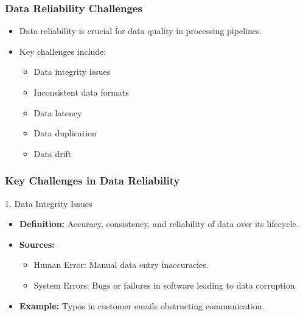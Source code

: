 \documentclass{beamer}
\begin{document}
\begin{frame}[fragile]
    \frametitle{Data Reliability Challenges}
    \begin{itemize}
        \item Data reliability is crucial for data quality in processing pipelines.
        \item Key challenges include:
        \begin{itemize}
            \item Data integrity issues
            \item Inconsistent data formats
            \item Data latency
            \item Data duplication
            \item Data drift
        \end{itemize}
    \end{itemize}
\end{frame}

\begin{frame}[fragile]
    \frametitle{Key Challenges in Data Reliability}
    \begin{block}{1. Data Integrity Issues}
        \begin{itemize}
            \item \textbf{Definition:} Accuracy, consistency, and reliability of data over its lifecycle.
            \item \textbf{Sources:}
                \begin{itemize}
                    \item Human Error: Manual data entry inaccuracies.
                    \item System Errors: Bugs or failures in software leading to data corruption.
                \end{itemize}
            \item \textbf{Example:} Typos in customer emails obstructing communication.
        \end{itemize}
    \end{block}
\end{frame}
\end{document}
